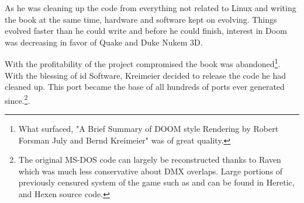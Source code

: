 \par
 As he was cleaning up the code from everything not related to Linux and writing the book at the same time, hardware and software kept on evolving. Things evolved faster than he could write and before he could finish, interest in Doom was decreasing in favor of Quake and Duke Nukem 3D.\\
 \par
  With the profitability of the project compromised the book was abandoned\footnote{What surfaced, "A Brief Summary of DOOM style Rendering by Robert Forsman July and Bernd Kreimeier" was of great quality.}. With the blessing of id Software, Kreimeier decided to release the code he had cleaned up. This port became the base of all hundreds of ports ever generated since.\footnote{The original MS-DOS code can largely be reconstructed thanks to Raven which was much less conservative about DMX overlaps. Large portions of previously censured system of the game such as  and  can be found in Heretic, and Hexen source code.}.\\
 \par  


